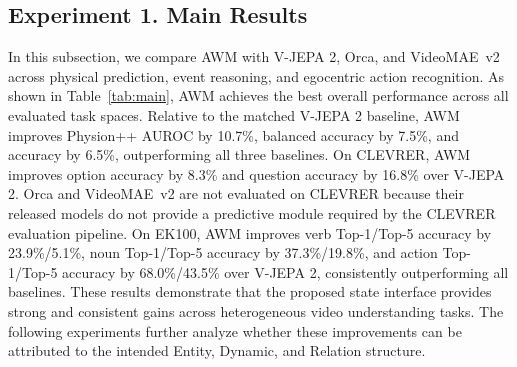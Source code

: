 \documentclass{article}
\begin{document}




\subsection{Experiment 1. Main Results}

In this subsection, we compare AWM with V-JEPA 2, Orca, and VideoMAE~v2 across physical prediction, event reasoning, and egocentric action recognition. As shown in Table~\ref{tab:main}, AWM achieves the best overall performance across all evaluated task spaces. Relative to the matched V-JEPA 2 baseline, AWM improves Physion++ AUROC by 10.7\%, balanced accuracy by 7.5\%, and accuracy by 6.5\%, outperforming all three baselines. On CLEVRER, AWM improves option accuracy by 8.3\% and question accuracy by 16.8\% over V-JEPA 2. Orca and VideoMAE~v2 are not evaluated on CLEVRER because their released models do not provide a predictive module required by the CLEVRER evaluation pipeline.
On EK100, AWM improves verb Top-1/Top-5 accuracy by 23.9\%/5.1\%, noun Top-1/Top-5 accuracy by 37.3\%/19.8\%, and action Top-1/Top-5 accuracy by 68.0\%/43.5\% over V-JEPA 2, consistently outperforming all baselines. These results demonstrate that the proposed state interface provides strong and consistent gains across heterogeneous video understanding tasks. The following experiments further analyze whether these improvements can be attributed to the intended Entity, Dynamic, and Relation structure.
\end{document}
